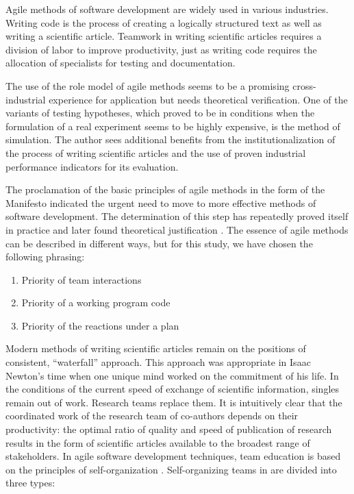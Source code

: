 \documentclass[12pt]{report}
\theoremstyle{definition}
\providecommand{\tightlist}{%
	\setlength{\itemsep}{0pt}\setlength{\parskip}{0pt}}
\begin{document}
Agile methods of software development are widely used in various industries. 
Writing code is the process of creating a logically structured text as well as writing a scientific article. 
Teamwork in writing scientific articles requires a division of labor to improve productivity, just as writing code requires the allocation of specialists for testing and documentation.

The use of the role model of agile methods seems to be a promising cross-industrial experience for application but needs theoretical verification. 
One of the variants of testing hypotheses, which proved to be in conditions when the formulation of a real experiment seems to be highly expensive, is the method of simulation. 
The author sees additional benefits from the institutionalization of the process of writing scientific articles and the use of proven industrial performance indicators for its evaluation.

The proclamation of the basic principles of agile methods in the form of the Manifesto \cite{fowler2001agile} indicated the urgent need to move to more effective methods of software development. 
The determination of this step has repeatedly proved itself in practice and later found theoretical justification \cite{bonner2016empirical}. 
The essence of agile methods can be described in different ways, but for this study, we have chosen the following phrasing:

\begin{enumerate}
	\tightlist
	\item Priority of team interactions
	\item Priority of a working program code
	\item Priority of the reactions under a plan
\end{enumerate}

Modern methods of writing scientific articles remain on the positions of consistent, ``waterfall'' approach.
This approach was appropriate in Isaac Newton's time when one unique mind worked on the commitment of his life.
In the conditions of the current speed of exchange of scientific information, singles remain out of work.
Research teams replace them.
It is intuitively clear that the coordinated work of the research team of co-authors depends on their productivity: the optimal ratio of quality and speed of publication of research results in the form of scientific articles available to the broadest range of stakeholders. 
In agile software development techniques, team education is based on the principles of self-organization \cite{hoda2016multi,moe2008understanding}.
Self-organizing teams in \cite{moe2009overcoming} are divided into three types:
\end{document}
